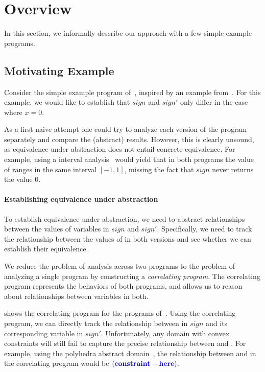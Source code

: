 \section{Overview}

In this section, we informally describe our approach with a few simple example programs.

\subsection{Motivating Example}



Consider the simple example program of~, inspired by an example from~\cite{RM:TOPLAS07}. For this example, we would like to establish that $sign$ and $sign'$ only differ in the case where $x=0$.

As a first naive attempt one could try to analyze each version of the program separately and compare the (abstract) results. However, this is clearly unsound, as equivalence under abstraction does not entail concrete equivalence. For example, using a interval analysis~\cite{TODO} would yield that in both programs the value of  ranges in the same interval $[-1,1]$, missing the fact that $sign$ never returns the value $0$.


\paragraph{Establishing equivalence under abstraction}
To establish equivalence under abstraction, we need to abstract relationships between the values of variables in $sign$ and $sign'$. Specifically, we need to track the relationship between the values of  in both versions and see whether we can establish their equivalence.

We reduce the problem of analysis across two programs to the problem of analyzing a single program by constructing a \emph{correlating program}. The correlating program represents the behaviors of both programs, and allows us to reason about relationships between variables in both.



 shows the correlating program for the programs of~. Using the correlating program, we can directly track the relationship between  in $sign$ and its corresponding variable  in $sign'$. Unfortunately, any domain with convex constraints will still fail to capture the precise relationship between  and . For example, using the polyhedra abstract domain~\cite{TODO}, the relationship between  and  in the correlating program would be ${\color{blue} \bf \langle constraint-here \rangle}$.

